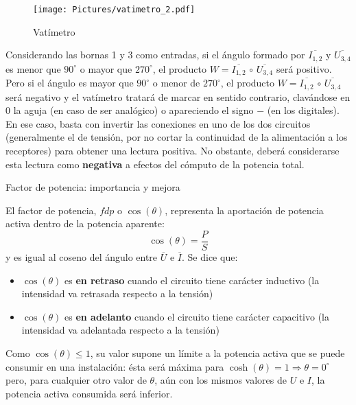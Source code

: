 \documentclass[11pt]{book} %
\makeatletter
\numberwithin{dummy}{section}
\theoremstyle{ocrenumbox}
\theoremstyle{blacknumex}
\theoremstyle{blacknumbox}
\theoremstyle{ocrenum}
\newenvironment{remark}{\par\vspace{10pt}\small %
\begin{list}{}{
\leftmargin=35pt %
\rightmargin=25pt}\item\ignorespaces %
\makebox[-2.5pt]{\begin{tikzpicture}[overlay]
\node[draw=ocre!60,line width=1pt,circle,fill=ocre!25,font=\sffamily\bfseries,inner sep=2pt,outer sep=0pt] at (-15pt,0pt){\textcolor{ocre}{N}};\end{tikzpicture}} %
\advance\baselineskip -1pt}{\end{list}\vskip5pt} %
\renewcommand{\section}{\@startsection{section}{1}{\z@}
{-4ex \@plus -1ex \@minus -.4ex}
{1ex \@plus.2ex }
{\normalfont\large\sffamily\bfseries}}
\newlength\esp
\makeatother
\begin{document}
	\begin{figure}[htbp]
	    \centering
	    \texttt{[image: Pictures/vatimetro\_2.pdf]}
	    \caption{Vatímetro}
	    \label{fig.vatimetro_2}
	\end{figure}
	Considerando las bornas 1 y 3 como entradas, si el ángulo formado por $\overline{I_{1,2}}$ y $\overline{U_{3,4}}$ es menor que $90^\circ$ o mayor que $270^\circ$, el producto $W=\overline{I_{1,2}}\,\circ\,\overline{U_{3,4}}$ será positivo. Pero si el ángulo es mayor que $90^\circ$ o menor de $270^\circ$, el producto $W=\overline{I_{1,2}}\,\circ\,\overline{U_{3,4}}$ será negativo y el vatímetro tratará de marcar en sentido contrario, clavándose en $0$ la aguja (en caso de ser analógico) o apareciendo el signo $-$ (en los digitales). En ese caso, basta con invertir las conexiones en uno de los dos circuitos (generalmente el de tensión, por no cortar la continuidad de la alimentación a los receptores) para obtener una lectura positiva. No obstante, deberá considerarse esta lectura como \textbf{negativa} a efectos del cómputo de la potencia total. 
	
	
	\section{Factor de potencia: importancia y mejora}\label{sec.mejora_fdp_monofasica}
	
	El factor de potencia, $fdp$ o $\cos(\theta)$, representa la aportación de potencia activa dentro de la potencia aparente:
	\begin{equation}
		\boxed{\cos(\theta)=\dfrac{P}{S}}
	\end{equation}
	y es igual al coseno del ángulo entre $\overline{U}$ e $\overline{I}$. Se dice que:
	\begin{itemize}
		\item $\cos(\theta)$ es \textbf{en retraso} cuando el circuito tiene carácter inductivo (la intensidad va retrasada respecto a la tensión)
		\item $\cos(\theta)$ es \textbf{en adelanto} cuando el circuito tiene carácter capacitivo (la intensidad va adelantada respecto a la tensión)
	\end{itemize}
	\begin{remark}
		Como $\cos(\theta)\leq 1$, su valor supone un límite a la potencia activa que se puede consumir en una instalación: ésta será máxima para $\cosh(\theta)=1\Rightarrow \theta=0^\circ$ pero, para cualquier otro valor de $\theta$, aún con los mismos valores de $U$ e $I$, la potencia activa consumida será inferior. 
	\end{remark}
	
\end{document}
